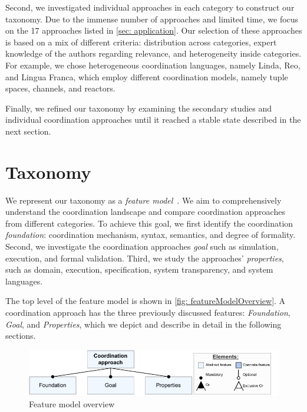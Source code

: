 \documentclass[runningheads]{llncs}
\begin{document}
Second, we investigated individual approaches in each category to construct our taxonomy.
Due to the immense number of approaches and limited time, we focus on the 17 approaches listed in \autoref{sec: application}.
Our selection of these approaches is based on a mix of different criteria: distribution across categories, expert knowledge of the authors regarding relevance, and heterogeneity inside categories.
For example, we chose heterogeneous coordination languages, namely Linda, Reo, and Lingua Franca, which employ different coordination models, namely tuple spaces, channels, and reactors.

Finally, we refined our taxonomy by examining the secondary studies and individual coordination approaches until it reached a stable state described in the next section.

\section{Taxonomy} \label{sec: taxonomy}
We represent our taxonomy as a \textit{feature model}~\cite{kangFeatureOrientedDomainAnalysis1990}.
We aim to comprehensively understand the coordination landscape and compare coordination approaches from different categories.
To achieve this goal, we first identify the coordination \textit{foundation}: coordination mechanism, syntax, semantics, and degree of formality.
Second, we investigate the coordination approaches \textit{goal} such as simulation, execution, and formal validation.
Third, we study the approaches' \textit{properties}, such as domain, execution, specification, system transparency, and system languages.

The top level of the feature model is shown in \autoref{fig: featureModelOverview}.
A coordination approach has the three previously discussed features: \textit{Foundation}, \textit{Goal}, and \textit{Properties}, which we depict and describe in detail in the following sections.

\begin{figure}[ht]
	\centering
	\includegraphics[width=1\textwidth]{images/root}
	\caption{Feature model overview}
	\label{fig: featureModelOverview}
\end{figure}
\end{document}
